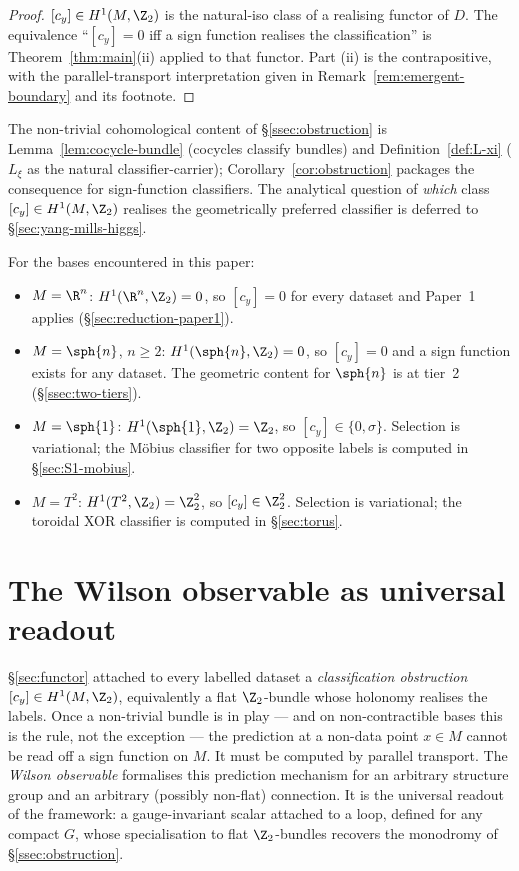 \begin{proof}
$[c_y]\in H^1(M,\Z_2)$ is the natural-iso class of a realising
functor of $D$. The equivalence ``$[c_y]=0$ iff a sign function
realises the classification'' is Theorem~\ref{thm:main}(ii) applied
to that functor. Part (ii) is the contrapositive, with the
parallel-transport interpretation given in
Remark~\ref{rem:emergent-boundary} and its footnote.
\end{proof}

The non-trivial cohomological content of \S\ref{ssec:obstruction}
is Lemma~\ref{lem:cocycle-bundle} (cocycles classify bundles) and
Definition~\ref{def:L-xi} ($L_\xi$ as the natural classifier-carrier);
Corollary~\ref{cor:obstruction} packages the consequence for
sign-function classifiers. The analytical question of \emph{which}
class $[c_y]\in H^1(M,\Z_2)$ realises the geometrically preferred
classifier is deferred to \S\ref{sec:yang-mills-higgs}.

\begin{remark}\label{rem:worked-classes}
For the bases encountered in this paper:
\begin{itemize}[leftmargin=2em]
\item $M=\R^n$: $H^1(\R^n,\Z_2)=0$, so $[c_y]=0$ for every dataset
and Paper~1 applies (\S\ref{sec:reduction-paper1}).
\item $M=\sph{n}$, $n\geq 2$: $H^1(\sph{n},\Z_2)=0$, so $[c_y]=0$
and a sign function exists for any dataset. The geometric content
for $\sph{n}$ is at tier~2 (\S\ref{ssec:two-tiers}).
\item $M=\sph{1}$: $H^1(\sph{1},\Z_2)=\Z_2$, so
$[c_y]\in\{0,\sigma\}$. Selection is variational; the M\"obius
classifier for two opposite labels is computed in
\S\ref{sec:S1-mobius}.
\item $M=T^2$: $H^1(T^2,\Z_2)=\Z_2^2$, so $[c_y]\in\Z_2^2$.
Selection is variational; the toroidal XOR classifier is computed
in \S\ref{sec:torus}.
\end{itemize}
\end{remark}

\section{The Wilson observable as universal readout}
\label{sec:wilson}

\S\ref{sec:functor} attached to every labelled dataset a
\emph{classification obstruction} $[c_y]\in H^1(M,\Z_2)$, equivalently
a flat $\Z_2$-bundle whose holonomy realises the labels. Once a
non-trivial bundle is in play --- and on non-contractible bases this
is the rule, not the exception --- the prediction at a non-data
point $x\in M$ cannot be read off a sign function on $M$. It must be
computed by parallel transport. The \emph{Wilson observable}
formalises this prediction mechanism for an arbitrary structure
group and an arbitrary (possibly non-flat) connection. It is the
universal readout of the framework: a gauge-invariant scalar
attached to a loop, defined for any compact $G$, whose specialisation
to flat $\Z_2$-bundles recovers the monodromy of \S\ref{ssec:obstruction}.

